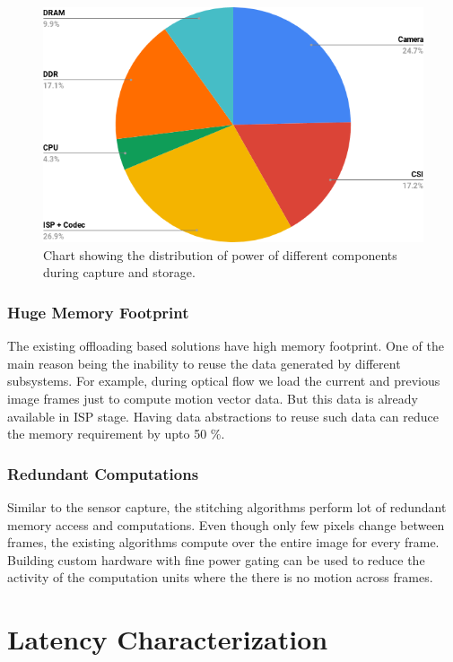 \begin{figure}[h]
	\begin{center}
		\includegraphics[width=1\textwidth]{data/images/chart.png}
	\end{center}
	\caption{Chart showing the distribution of power of different components during capture and storage.}	
	\label{fig:pieCapPow}
\end{figure} 

\subsubsection{Huge Memory Footprint}
The existing offloading based solutions have high memory footprint. One of the main reason being the inability to reuse the data generated by different subsystems. For example, during optical flow we load the current and previous image frames just to compute motion vector data. But this data is already available in ISP stage. Having data abstractions to reuse such data can reduce the memory requirement by upto 50 \%.


\subsubsection{Redundant Computations}
Similar to the sensor capture, the stitching algorithms perform lot of redundant memory access and computations. Even though only few pixels change between frames, the existing algorithms compute over the entire image for every frame. Building custom hardware with fine power gating can be used to reduce the activity of the computation units where the there is no motion across frames. 



\section{Latency Characterization}

